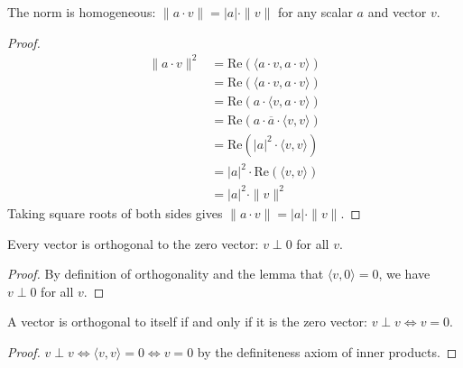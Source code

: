 \begin{theorem}
  \label{theorem : sca_mul}
  \leanok
  The norm is homogeneous: $\|a \cdot v\| = |a| \cdot \|v\|$ for any scalar $a$ and vector $v$.
\end{theorem}
\begin{proof}
  \begin{align}
  \|a \cdot v\|^2 &= \text{Re}(\langle a \cdot v, a \cdot v \rangle) \\
  &= \text{Re}(\langle a \cdot v, a \cdot v \rangle) \\
  &= \text{Re}(a \cdot \langle v, a \cdot v \rangle) \\
  &= \text{Re}(a \cdot \overline{a} \cdot \langle v, v \rangle) \\
  &= \text{Re}(|a|^2 \cdot \langle v, v \rangle) \\
  &= |a|^2 \cdot \text{Re}(\langle v, v \rangle) \\
  &= |a|^2 \cdot \|v\|^2
  \end{align}
  Taking square roots of both sides gives $\|a \cdot v\| = |a| \cdot \|v\|$.
\end{proof}

\begin{theorem}
  \label{theorem : ortho_zero}
  Every vector is orthogonal to the zero vector: $v \perp 0$ for all $v$.
\end{theorem}
\begin{proof}
  By definition of orthogonality and the lemma that $\langle v, 0 \rangle = 0$, we have $v \perp 0$ for all $v$.
\end{proof}

\begin{theorem}
  \label{theorem : ortho_self_zero}
  \leanok
  A vector is orthogonal to itself if and only if it is the zero vector: $v \perp v \iff v = 0$.
\end{theorem}
\begin{proof}
  $v \perp v \iff \langle v, v \rangle = 0 \iff v = 0$ by the definiteness axiom of inner products.
\end{proof}

